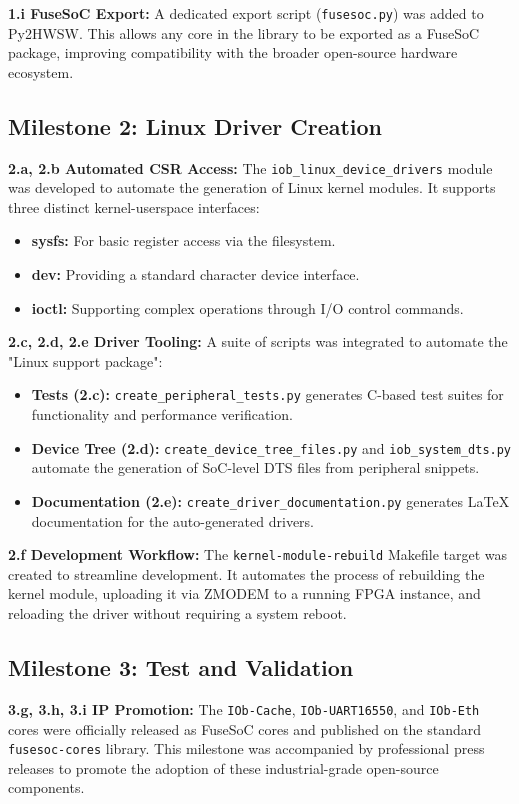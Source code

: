\textbf{1.i FuseSoC Export:}
A dedicated export script (\texttt{fusesoc.py}) was added to Py2HWSW. This allows any core in the library to be exported as a FuseSoC package, improving compatibility with the broader open-source hardware ecosystem.

\subsection{Milestone 2: Linux Driver Creation}

\textbf{2.a, 2.b Automated CSR Access:}
The \texttt{iob\_linux\_device\_drivers} module was developed to automate the generation of Linux kernel modules. It supports three distinct kernel-userspace interfaces:
\begin{itemize}
    \item \textbf{sysfs:} For basic register access via the filesystem.
    \item \textbf{dev:} Providing a standard character device interface.
    \item \textbf{ioctl:} Supporting complex operations through I/O control commands.
\end{itemize}

\textbf{2.c, 2.d, 2.e Driver Tooling:}
A suite of scripts was integrated to automate the "Linux support package":
\begin{itemize}
    \item \textbf{Tests (2.c):} \texttt{create\_peripheral\_tests.py} generates C-based test suites for functionality and performance verification.
    \item \textbf{Device Tree (2.d):} \texttt{create\_device\_tree\_files.py} and \texttt{iob\_system\_dts.py} automate the generation of SoC-level DTS files from peripheral snippets.
    \item \textbf{Documentation (2.e):} \texttt{create\_driver\_documentation.py} generates LaTeX documentation for the auto-generated drivers.
\end{itemize}

\textbf{2.f Development Workflow:}
The \texttt{kernel-module-rebuild} Makefile target was created to streamline development. It automates the process of rebuilding the kernel module, uploading it via ZMODEM to a running FPGA instance, and reloading the driver without requiring a system reboot.

\subsection{Milestone 3: Test and Validation}

\textbf{3.g, 3.h, 3.i IP Promotion:}
The \texttt{IOb-Cache}, \texttt{IOb-UART16550}, and \texttt{IOb-Eth} cores were officially released as FuseSoC cores and published on the standard \texttt{fusesoc-cores} library. This milestone was accompanied by professional press releases to promote the adoption of these industrial-grade open-source components.
